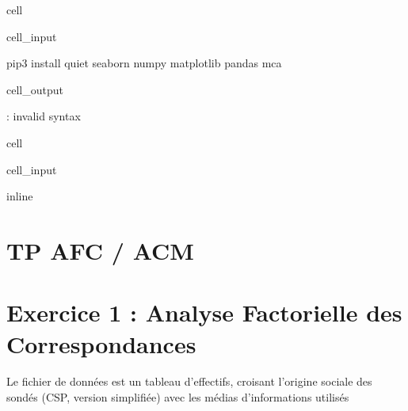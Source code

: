\documentclass[letterpaper,10pt,french]{sphinxmanual}
\begin{document}
\begin{sphinxuseclass}{cell}
\begin{sphinxuseclass}{cell_input}
\begin{sphinxVerbatim}[commandchars=\\\{\}]
          
  
    pip3 install \PYGZhy{}\PYGZhy{}quiet seaborn numpy matplotlib pandas mca 
\end{sphinxVerbatim}

\end{sphinxuseclass}
\begin{sphinxuseclass}{cell_output}
\begin{sphinxVerbatim}[commandchars=\\\{\}]
    \PYG{p}{[}\PYG{p}{]}
         
: invalid syntax
\end{sphinxVerbatim}

\end{sphinxuseclass}
\end{sphinxuseclass}
\begin{sphinxuseclass}{cell}
\begin{sphinxuseclass}{cell_input}
\begin{sphinxVerbatim}[commandchars=\\\{\}]
   
   
    
   
 inline
\end{sphinxVerbatim}

\end{sphinxuseclass}
\end{sphinxuseclass}

\chapter{TP AFC / ACM}
\label{\detokenize{TP3_AFC_ACM:tp-afc-acm}}\label{\detokenize{TP3_AFC_ACM::doc}}

\chapter{Exercice 1 : Analyse Factorielle des Correspondances}
\label{\detokenize{TP3_AFC_ACM:exercice-1-analyse-factorielle-des-correspondances}}
\sphinxAtStartPar
Le fichier de données est un tableau d’effectifs, croisant l’origine sociale des sondés (CSP, version simplifiée) avec les médias d’informations utilisés
\end{document}
